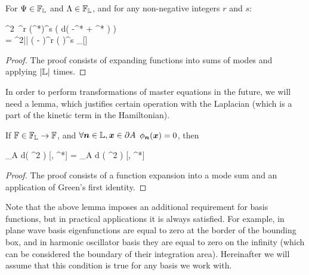 \begin{lemma}
\label{lmm:func-calculus:fourier-of-moments}
	For $\Psi \in \mathbb{F}_{\mathbb{L}}$ and $\Lambda \in \mathbb{F}_{\mathbb{L}}$, and for any non-negative integers $r$ and $s$:
	\begin{eqn*}
		\int \delta^2\Psi\, \Psi^r (\Psi^*)^s \exp \left(
				\int d\xvec \left( -\Lambda \Psi^* + \Lambda^* \Psi \right)
			\right) \\
		= \pi^{2|\restbasis|}
			\left( -\frac{\delta}{\delta \Lambda^*} \right)^r
			\left( \frac{\delta}{\delta \Lambda} \right)^s
			\Delta_{\restbasis}[\Lambda]
	\end{eqn*}
\end{lemma}
\begin{proof}
The proof consists of expanding functions into sums of modes and applying  $|\mathbb{L}|$ times.
\end{proof}

In order to perform transformations of master equations in the future, we will need a lemma, which justifies certain operation with the Laplacian (which is a part of the kinetic term in the Hamiltonian).

\begin{lemma}
\label{lmm:func-calculus:move-laplacian}
	If $\mathbb{F} \in \mathbb{F}_{\mathbb{L}} \rightarrow \mathbb{F}$, and $\forall \boldsymbol{n} \in \mathbb{L}, \boldsymbol{x} \in \partial A$ $\phi_{\boldsymbol{n}}(\boldsymbol{x}) = 0$, then
	\begin{eqn*}
		\int\limits_A d\xvec \left(
			\nabla^2 \frac{\delta}{\delta \Psi}
		\right) \Psi {}[\Psi, \Psi^*]
		= \int\limits_A d\xvec \frac{\delta}{\delta \Psi}
		( \nabla^2 \Psi ) [\Psi, \Psi^*]
	\end{eqn*}
\end{lemma}
\begin{proof}
The proof consists of a function expansion into a mode sum and an application of Green's first identity.
\end{proof}

Note that the above lemma imposes an additional requirement for basis functions, but in practical applications it is always satisfied.
For example, in plane wave basis eigenfunctions are equal to zero at the border of the bounding box, and in harmonic oscillator basis they are equal to zero on the infinity (which can be considered the boundary of their integration area).
Hereinafter we will assume that this condition is true for any basis we work with.
